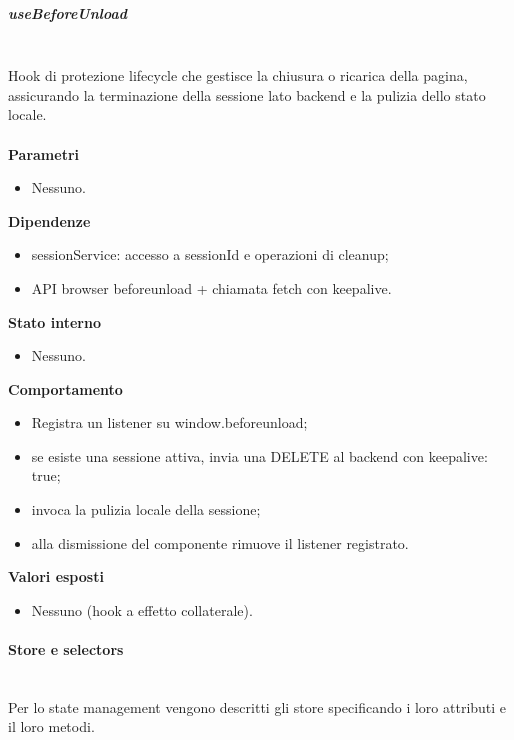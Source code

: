 \documentclass[a4paper,12pt]{article}
\begin{document}
                \subparagraph{useBeforeUnload}\mbox{}\\
                Hook di protezione lifecycle che gestisce la chiusura o ricarica della pagina, assicurando la terminazione della sessione lato backend e la pulizia dello stato locale.\\\\
                \textbf{Parametri}
                \begin{itemize}
                    \item Nessuno.
                \end{itemize}
                \textbf{Dipendenze}
                \begin{itemize}
                    \item {\ttfamily sessionService}: accesso a sessionId e operazioni di cleanup;
                    \item API browser {\ttfamily beforeunload} + chiamata {\ttfamily fetch} con {\ttfamily keepalive}.
                \end{itemize}
                \textbf{Stato interno}
                \begin{itemize}
                    \item Nessuno.
                \end{itemize}
                \textbf{Comportamento}
                \begin{itemize}
                    \item Registra un listener su {\ttfamily window.beforeunload};
                    \item se esiste una sessione attiva, invia una DELETE al backend con {\ttfamily keepalive: true};
                    \item invoca la pulizia locale della sessione;
                    \item alla dismissione del componente rimuove il listener registrato.
                \end{itemize}
                \textbf{Valori esposti}
                \begin{itemize}
                    \item Nessuno (hook a effetto collaterale).
                \end{itemize}

            \paragraph{Store e selectors}\mbox{}\\
            Per lo state management vengono descritti gli store specificando i loro attributi e il loro metodi.
\end{document}
